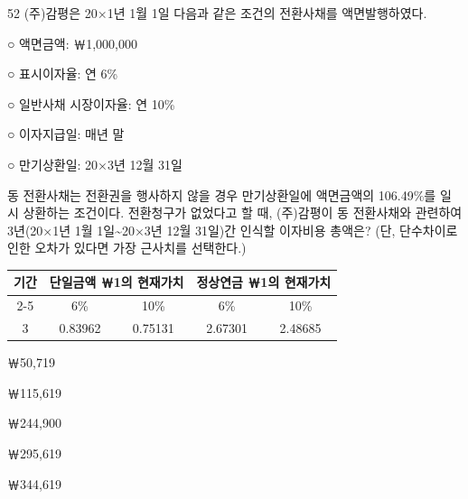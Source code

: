 \begin{question}{52}
(주)감평은 20×1년 1월 1일 다음과 같은 조건의 전환사채를 액면발행하였다.
\begin{framedtext}
○ 액면금액: ￦1,000,000 \par
○ 표시이자율: 연 6\% \par
○ 일반사채 시장이자율: 연 10\% \par
○ 이자지급일: 매년 말 \par
○ 만기상환일: 20×3년 12월 31일 \par
\end{framedtext}
동 전환사채는 전환권을 행사하지 않을 경우 만기상환일에 액면금액의 106.49\%를 일시 상환하는 조건이다. 전환청구가 없었다고 할 때, (주)감평이 동 전환사채와 관련하여 3년(20×1년 1월 1일\textasciitilde 20×3년 12월 31일)간 인식할 이자비용 총액은? (단, 단수차이로 인한 오차가 있다면 가장 근사치를 선택한다.)
\par{\small\centering\begin{tabular}{|c|c|c|c|c|}\hline
\multirow{2}{*}{기간} & \multicolumn{2}{c|}{단일금액 ￦1의 현재가치} & \multicolumn{2}{c|}{정상연금 ￦1의 현재가치} \\ \cline{2-5}
 & 6\% & 10\% & 6\% & 10\% \\ \hline
3 & 0.83962 & 0.75131 & 2.67301 & 2.48685 \\ \hline
\end{tabular}\par}
\begin{choices}
  \item ￦50,719
  \item ￦115,619
  \item ￦244,900
  \item ￦295,619
  \item ￦344,619
\end{choices}
\end{question}
